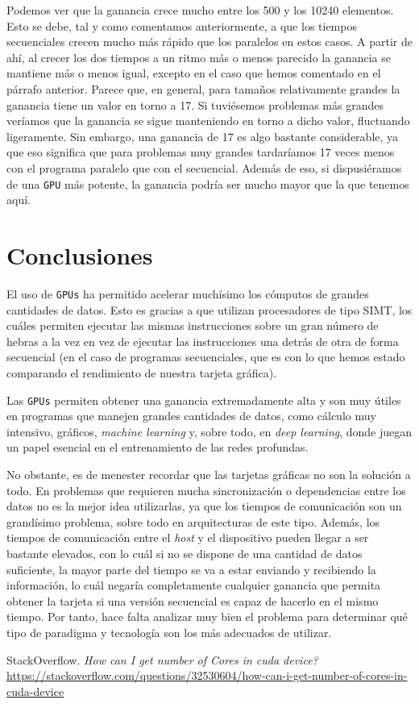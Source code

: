 \documentclass[11pt,a4paper]{article}
\begin{document}
Podemos ver que la ganancia crece mucho entre los 500 y los 10240 elementos. Esto se
debe, tal y como comentamos anteriormente, a que los tiempos secuenciales crecen mucho
más rápido que los paralelos en estos casos. A partir de ahí, al crecer los dos tiempos a
un ritmo más o menos parecido la ganancia se mantiene más o menos igual, excepto en el caso
que hemos comentado en el párrafo anterior. Parece que, en general, para tamaños relativamente
grandes la ganancia tiene un valor en torno a 17. Si tuviésemos problemas
más grandes veríamos que la ganancia se sigue manteniendo en torno a dicho valor, fluctuando
ligeramente. Sin embargo, una ganancia de 17 es algo bastante considerable, ya que eso significa
que para problemas muy grandes tardaríamos 17 veces menos con el programa paralelo que
con el secuencial. Además de eso, si dispusiéramos de una \texttt{GPU} más potente, la
ganancia podría ser mucho mayor que la que tenemos aquí.

\section{Conclusiones}

El uso de \texttt{GPUs} ha permitido acelerar muchísimo los cómputos de grandes cantidades
de datos. Esto es gracias a que utilizan procesadores de tipo SIMT, los cuáles permiten
ejecutar las mismas instrucciones sobre un gran número de hebras a la vez en vez de ejecutar las
instrucciones una detrás de otra de forma secuencial (en el caso de programas secuenciales,
que es con lo que hemos estado comparando el rendimiento de nuestra tarjeta gráfica).

Las \texttt{GPUs} permiten obtener una ganancia extremadamente alta y son muy útiles en
programas que manejen grandes cantidades de datos, como cálculo muy intensivo, gráficos,
\textit{machine learning} y, sobre todo, en \textit{deep learning}, donde juegan un papel
esencial en el entrenamiento de las redes profundas.

No obstante, es de menester recordar que las tarjetas gráficas no son la solución a todo.
En problemas que requieren mucha sincronización o dependencias entre los datos no es la
mejor idea utilizarlas, ya que los tiempos de comunicación son un grandísimo problema, sobre
todo en arquitecturas de este tipo. Además, los tiempos de comunicación entre el \textit{host}
y el dispositivo pueden llegar a ser bastante elevados, con lo cuál si no se dispone de una
cantidad de datos suficiente, la mayor parte del tiempo se va a estar enviando y recibiendo la
información, lo cuál negaría completamente cualquier ganancia que permita obtener la tarjeta si
una versión secuencial es capaz de hacerlo en el mismo tiempo. Por tanto, hace falta analizar muy
bien el problema para determinar qué tipo de paradigma y tecnología son los más adecuados de
utilizar.


\newpage

\begin{thebibliography}{5}

StackOverflow. \textit{How can I get number of Cores in cuda device?}
\\\url{https://stackoverflow.com/questions/32530604/how-can-i-get-number-of-cores-in-cuda-device}

\end{thebibliography}
\end{document}
